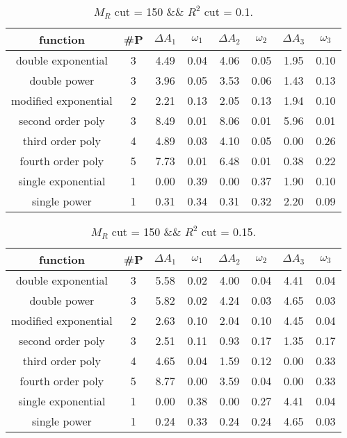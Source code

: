  
\begin{table}[H] 
\begin{center} 
\begin{tabular}{|c|c|cc|cc|cc|} 
\hline function & \#P & $\Delta A_1$ & $\omega_1$ & $\Delta A_2$ & $\omega_2$ & $\Delta A_3$ & $\omega_3$ \\ \hline 
double exponential &  3 &   4.49 &   0.04 &   4.06 &   0.05 &   1.95 &   0.10 \\ 
double power &  3 &   3.96 &   0.05 &   3.53 &   0.06 &   1.43 &   0.13 \\ 
modified exponential &  2 &   2.21 &   0.13 &   2.05 &   0.13 &   1.94 &   0.10 \\ 
second order poly &  3 &   8.49 &   0.01 &   8.06 &   0.01 &   5.96 &   0.01 \\ 
third order poly &  4 &   4.89 &   0.03 &   4.10 &   0.05 &   0.00 &   0.26 \\ 
fourth order poly &  5 &   7.73 &   0.01 &   6.48 &   0.01 &   0.38 &   0.22 \\ 
single exponential &  1 &   0.00 &   0.39 &   0.00 &   0.37 &   1.90 &   0.10 \\ 
single power &  1 &   0.31 &   0.34 &   0.31 &   0.32 &   2.20 &   0.09 \\ 
\hline 
\end{tabular} 
\caption{$M_R$ cut = 150 \&\& $R^2$ cut = 0.1.} 
\label{tab:FitChoices_150_0.1} 
\end{center} 
\end{table} 
 
 
\begin{table}[H] 
\begin{center} 
\begin{tabular}{|c|c|cc|cc|cc|} 
\hline function & \#P & $\Delta A_1$ & $\omega_1$ & $\Delta A_2$ & $\omega_2$ & $\Delta A_3$ & $\omega_3$ \\ \hline 
double exponential &  3 &   5.58 &   0.02 &   4.00 &   0.04 &   4.41 &   0.04 \\ 
double power &  3 &   5.82 &   0.02 &   4.24 &   0.03 &   4.65 &   0.03 \\ 
modified exponential &  2 &   2.63 &   0.10 &   2.04 &   0.10 &   4.45 &   0.04 \\ 
second order poly &  3 &   2.51 &   0.11 &   0.93 &   0.17 &   1.35 &   0.17 \\ 
third order poly &  4 &   4.65 &   0.04 &   1.59 &   0.12 &   0.00 &   0.33 \\ 
fourth order poly &  5 &   8.77 &   0.00 &   3.59 &   0.04 &   0.00 &   0.33 \\ 
single exponential &  1 &   0.00 &   0.38 &   0.00 &   0.27 &   4.41 &   0.04 \\ 
single power &  1 &   0.24 &   0.33 &   0.24 &   0.24 &   4.65 &   0.03 \\ 
\hline 
\end{tabular} 
\caption{$M_R$ cut = 150 \&\& $R^2$ cut = 0.15.} 
\label{tab:FitChoices_150_0.15} 
\end{center} 
\end{table} 
 
